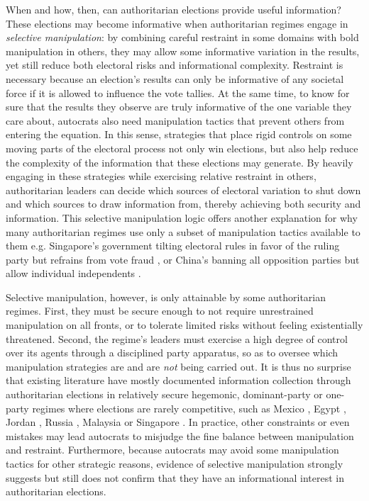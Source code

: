 \documentclass[12pt]{article}
\newcommand{\1}{\mathbbm{1}}
\begin{document}
When and how, then, can authoritarian elections provide useful information? These elections may become informative when authoritarian regimes engage in \textit{selective manipulation}: by combining careful restraint in some domains with bold manipulation in others, they may allow some informative variation in the results, yet still reduce both electoral risks and informational complexity. Restraint is necessary because an election's results can only be informative of any societal force if it is allowed to influence the vote tallies. At the same time, to know for sure that the results they observe are truly informative of the one variable they care about, autocrats also need manipulation tactics that prevent others from entering the equation. In this sense, strategies that place rigid controls on some moving parts of the electoral process not only win elections, but also help reduce the complexity of the information that these elections may generate. By heavily engaging in these strategies while exercising relative restraint in others, authoritarian leaders can decide which sources of electoral variation to shut down and which sources to draw information from, thereby achieving both security and information. This selective manipulation logic offers another explanation for why many authoritarian regimes use only a subset of manipulation tactics available to them e.g. Singapore's government tilting electoral rules in favor of the ruling party but refrains from vote fraud \citep{Tan2013}, or China's banning all opposition parties but allow individual independents \citep[see][]{Junzhi2010}.

Selective manipulation, however, is only attainable by some authoritarian regimes. First, they must be secure enough to not require unrestrained manipulation on all fronts, or to tolerate limited risks without feeling existentially threatened. Second, the regime's leaders must exercise a high degree of control over its agents through a disciplined party apparatus, so as to oversee which manipulation strategies are and are \textit{not} being carried out. It is thus no surprise that existing literature have mostly documented information collection through authoritarian elections in relatively secure hegemonic, dominant-party or one-party regimes where elections are rarely competitive, such as Mexico \citep{Magaloni2006}, Egypt \citep{Blaydes2010}, Jordan \citep{LustOkar2005}, Russia \citep{Myagkov2009, RundlettSvolik2016}, Malaysia \citep{Brownlee2007} or Singapore \citep{Miller2015}. In practice, other constraints or even mistakes may lead autocrats to misjudge the fine balance between manipulation and restraint. Furthermore, because autocrats may avoid some manipulation tactics for other strategic reasons, evidence of selective manipulation strongly suggests but still does not confirm that they have an informational interest in authoritarian elections.
\end{document}
